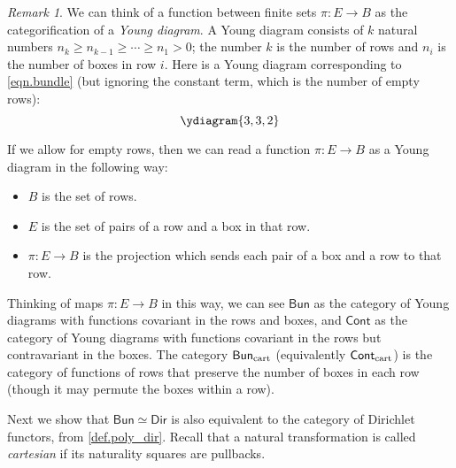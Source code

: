 \documentclass[11pt, article, one side]{memoir}
\theoremstyle{theorem}
\theoremstyle{definition}
\theoremstyle{remark}
\newtheorem{remark}[section]{Remark}
\newcommand{\Cat}[1]{\mathsf{#1}}%
\newcommand{\tn}[1]{\textnormal{#1}}
\newcommand{\cont}{\Cat{Cont}}
\newcommand{\bun}{\Cat{Bun}}
\newcommand{\dir}{\Cat{Dir}}
\begin{document}
\begin{remark}
We can think of a function between finite sets $\pi\colon E \to B$ as the categorification of a \emph{Young diagram}. A Young diagram consists of $k$ natural numbers $n_k \geq n_{k-1} \geq \cdots \geq n_1 > 0$; the number $k$ is the number of rows and $n_i$ is the number of boxes in row $i$. Here is a Young diagram corresponding to \cref{eqn.bundle} (but ignoring the constant term, which is the number of empty rows):
\[
\ydiagram{3, 3, 2}
\]

If we allow for empty rows, then we can read a function $\pi\colon E \to B$ as a Young diagram in the following way:
\begin{itemize}
    \item $B$ is the set of rows.
    \item $E$ is the set of pairs of a row and a box in that row.
    \item $\pi\colon E \to B$ is the projection which sends each pair of a box and a row to that row.
\end{itemize}
Thinking of maps $\pi\colon E \to B$ in this way, we can see $\bun$ as the category of Young diagrams with functions covariant in the rows and boxes, and $\cont$ as the category of Young diagrams with functions covariant in the rows but contravariant in the boxes. The category $\bun_{\tn{cart}}$ (equivalently $\cont_{\tn{cart}}$) is the category of functions of rows that preserve the number of boxes in each row (though it may permute the boxes within a row).
\end{remark}

 Next we show that $\bun\simeq\dir$ is also equivalent to the category of Dirichlet functors, from \cref{def.poly_dir}. Recall that a natural transformation is called \emph{cartesian} if its naturality squares are pullbacks.
\end{document}
